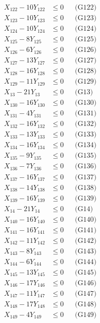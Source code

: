 \documentclass[a4paper,10pt]{article}
\begin{document}
{\begin{align}
X_{122} - 10Y_{122} &\leq 0 && \text{(G122)} \\
X_{123} - 10Y_{123} &\leq 0 && \text{(G123)} \\
X_{124} - 10Y_{124} &\leq 0 && \text{(G124)} \\
X_{125} - 8Y_{125} &\leq 0 && \text{(G125)} \\
X_{126} - 6Y_{126} &\leq 0 && \text{(G126)} \\
X_{127} - 13Y_{127} &\leq 0 && \text{(G127)} \\
X_{128} - 16Y_{128} &\leq 0 && \text{(G128)} \\
X_{129} - 11Y_{129} &\leq 0 && \text{(G129)} \\
X_{13} - 21Y_{13} &\leq 0 && \text{(G13)} \\
X_{130} - 16Y_{130} &\leq 0 && \text{(G130)} \\
X_{131} - 4Y_{131} &\leq 0 && \text{(G131)} \\
X_{132} - 16Y_{132} &\leq 0 && \text{(G132)} \\
X_{133} - 13Y_{133} &\leq 0 && \text{(G133)} \\
\allowbreak
X_{134} - 16Y_{134} &\leq 0 && \text{(G134)} \\
X_{135} - 9Y_{135} &\leq 0 && \text{(G135)} \\
X_{136} - 7Y_{136} &\leq 0 && \text{(G136)} \\
X_{137} - 16Y_{137} &\leq 0 && \text{(G137)} \\
X_{138} - 14Y_{138} &\leq 0 && \text{(G138)} \\
X_{139} - 16Y_{139} &\leq 0 && \text{(G139)} \\
X_{14} - 21Y_{14} &\leq 0 && \text{(G14)} \\
X_{140} - 16Y_{140} &\leq 0 && \text{(G140)} \\
X_{141} - 16Y_{141} &\leq 0 && \text{(G141)} \\
X_{142} - 11Y_{142} &\leq 0 && \text{(G142)} \\
X_{143} - 8Y_{143} &\leq 0 && \text{(G143)} \\
X_{144} - 6Y_{144} &\leq 0 && \text{(G144)} \\
X_{145} - 13Y_{145} &\leq 0 && \text{(G145)} \\
X_{146} - 17Y_{146} &\leq 0 && \text{(G146)} \\
X_{147} - 11Y_{147} &\leq 0 && \text{(G147)} \\
X_{148} - 17Y_{148} &\leq 0 && \text{(G148)} \\
X_{149} - 4Y_{149} &\leq 0 && \text{(G149)} \\

\end{align}}
\end{document}
